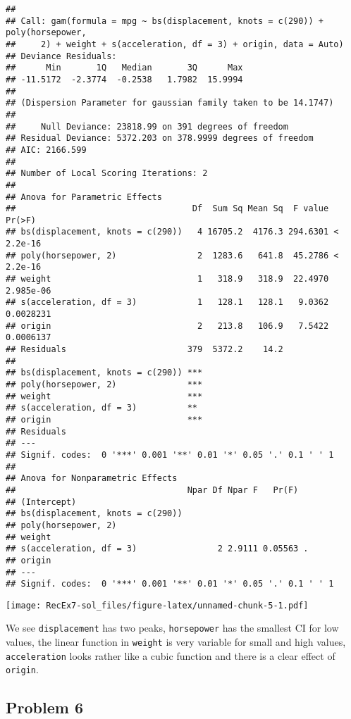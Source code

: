 \documentclass[]{article}
\begin{document}
\begin{verbatim}
## 
## Call: gam(formula = mpg ~ bs(displacement, knots = c(290)) + poly(horsepower, 
##     2) + weight + s(acceleration, df = 3) + origin, data = Auto)
## Deviance Residuals:
##      Min       1Q   Median       3Q      Max 
## -11.5172  -2.3774  -0.2538   1.7982  15.9994 
## 
## (Dispersion Parameter for gaussian family taken to be 14.1747)
## 
##     Null Deviance: 23818.99 on 391 degrees of freedom
## Residual Deviance: 5372.203 on 378.9999 degrees of freedom
## AIC: 2166.599 
## 
## Number of Local Scoring Iterations: 2 
## 
## Anova for Parametric Effects
##                                   Df  Sum Sq Mean Sq  F value    Pr(>F)
## bs(displacement, knots = c(290))   4 16705.2  4176.3 294.6301 < 2.2e-16
## poly(horsepower, 2)                2  1283.6   641.8  45.2786 < 2.2e-16
## weight                             1   318.9   318.9  22.4970 2.985e-06
## s(acceleration, df = 3)            1   128.1   128.1   9.0362 0.0028231
## origin                             2   213.8   106.9   7.5422 0.0006137
## Residuals                        379  5372.2    14.2                   
##                                     
## bs(displacement, knots = c(290)) ***
## poly(horsepower, 2)              ***
## weight                           ***
## s(acceleration, df = 3)          ** 
## origin                           ***
## Residuals                           
## ---
## Signif. codes:  0 '***' 0.001 '**' 0.01 '*' 0.05 '.' 0.1 ' ' 1
## 
## Anova for Nonparametric Effects
##                                  Npar Df Npar F   Pr(F)  
## (Intercept)                                              
## bs(displacement, knots = c(290))                         
## poly(horsepower, 2)                                      
## weight                                                   
## s(acceleration, df = 3)                2 2.9111 0.05563 .
## origin                                                   
## ---
## Signif. codes:  0 '***' 0.001 '**' 0.01 '*' 0.05 '.' 0.1 ' ' 1
\end{verbatim}

\texttt{[image: RecEx7-sol\_files/figure-latex/unnamed-chunk-5-1.pdf]}

We see \texttt{displacement} has two peaks, \texttt{horsepower} has the
smallest CI for low values, the linear function in \texttt{weight} is
very variable for small and high values, \texttt{acceleration} looks
rather like a cubic function and there is a clear effect of
\texttt{origin}.

\subsection{Problem 6}\label{problem-6}
\end{document}
